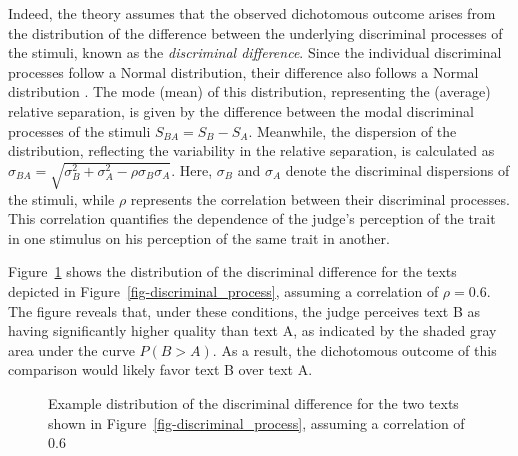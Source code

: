 \documentclass[
  authoryear,
  preprint,
  1p]{elsarticle}
\begin{document}
Indeed, the theory assumes that the observed dichotomous outcome arises
from the distribution of the difference between the underlying
discriminal processes of the stimuli, known as the \emph{discriminal
difference}. Since the individual discriminal processes follow a Normal
distribution, their difference also follows a Normal distribution
\citep{Andrich_1978}. The mode (mean) of this distribution, representing
the (average) relative separation, is given by the difference between
the modal discriminal processes of the stimuli
\(S_{BA} = S_{B} - S_{A}\). Meanwhile, the dispersion of the
distribution, reflecting the variability in the relative separation, is
calculated as
\(\sigma_{BA} = \sqrt{\sigma_{B}^{2} + \sigma_{A}^{2} - \rho\sigma_{B}\sigma_{A}}\).
Here, \(\sigma_{B}\) and \(\sigma_{A}\) denote the discriminal
dispersions of the stimuli, while \(\rho\) represents the correlation
between their discriminal processes. This correlation quantifies the
dependence of the judge's perception of the trait in one stimulus on his
perception of the same trait in another.

Figure~\ref{fig-discriminal_difference} shows the distribution of the
discriminal difference for the texts depicted in
Figure~\ref{fig-discriminal_process}, assuming a correlation of
\(\rho = 0.6\). The figure reveals that, under these conditions, the
judge perceives text B as having significantly higher quality than text
A, as indicated by the shaded gray area under the curve \(P(B > A)\). As
a result, the dichotomous outcome of this comparison would likely favor
text B over text A.

\begin{figure}


\caption{\label{fig-discriminal_difference}Example distribution of the
discriminal difference for the two texts shown in
Figure~\ref{fig-discriminal_process}, assuming a correlation of 0.6}

\end{figure}%
\end{document}
